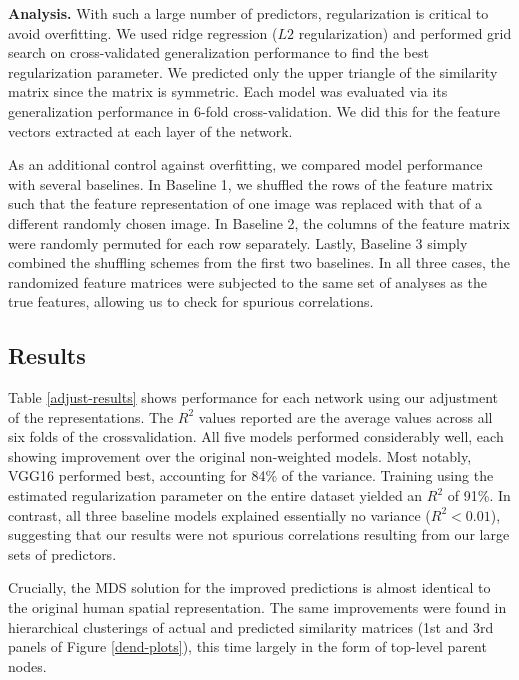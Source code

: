 \documentclass[10pt,letterpaper]{article}
\newcommand{\comment}[1]{}
\begin{document}
\noindent \textbf{Analysis.} With such a large number of predictors, regularization is critical to avoid overfitting. We used ridge regression ($L2$ regularization) and performed grid search on cross-validated generalization performance to find the best regularization parameter. We predicted only the upper triangle of the similarity matrix since the matrix is symmetric. Each model was evaluated via its generalization performance in 6-fold cross-validation. We did this for the feature vectors extracted at each layer of the network.

As an additional control against overfitting, we compared model performance with several baselines. In Baseline 1, we shuffled the rows of the feature matrix such that the feature representation of one image was replaced with that of a different randomly chosen image. In Baseline 2, the columns of the feature matrix were randomly permuted for each row separately. Lastly, Baseline 3 simply combined the shuffling schemes from the first two baselines. In all three cases, the randomized feature matrices were subjected to the same set of analyses as the true features, allowing us to check for spurious correlations. \\

\subsection{Results} Table \ref{adjust-results} shows performance for each network using our adjustment of the\comment{CNN} representations. The $R^{2}$ values reported are the average values across all six folds of the crossvalidation. All five models performed considerably well, each showing improvement over the original non-weighted models. Most notably, VGG16 performed best, accounting for 84\% of the variance. Training using the estimated regularization parameter on the entire dataset yielded an $R^{2}$ of 91\%. In contrast, all three baseline models explained essentially no variance ($R^{2}<0.01$), suggesting that our results were not spurious correlations resulting from our large sets of predictors. %

Crucially, the MDS solution for the improved predictions is almost identical to the original human spatial representation. The same improvements were found in hierarchical clusterings of actual and predicted similarity matrices (1st and 3rd panels of Figure \ref{dend-plots}), this time largely in the form of top-level parent nodes. \\
\end{document}
